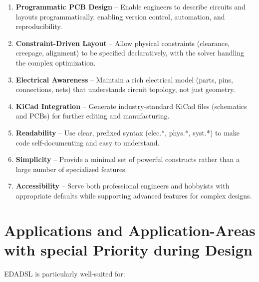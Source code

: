 \documentclass{report}
\begin{document}
\begin{enumerate}
\item \textbf{Programmatic PCB Design} -- Enable engineers to describe circuits and layouts programmatically, enabling version control, automation, and reproducibility.

\item \textbf{Constraint-Driven Layout} -- Allow physical constraints (clearance, creepage, alignment) to be specified declaratively, with the solver handling the complex optimization.

\item \textbf{Electrical Awareness} -- Maintain a rich electrical model (parts, pins, connections, nets) that understands circuit topology, not just geometry.

\item \textbf{KiCad Integration} -- Generate industry-standard KiCad files (schematics and PCBs) for further editing and manufacturing.

\item \textbf{Readability} -- Use clear, prefixed syntax (elec.*, phys.*, syst.*) to make code self-documenting and easy to understand.

\item \textbf{Simplicity} -- Provide a minimal set of powerful constructs rather than a large number of specialized features.

\item \textbf{Accessibility} -- Serve both professional engineers and hobbyists with appropriate defaults while supporting advanced features for complex designs.
\end{enumerate}

\section{Applications and Application-Areas with special Priority during Design}
EDADSL is particularly well-suited for:
\end{document}
